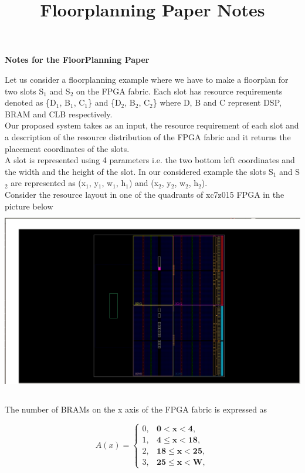 \documentclass[11pt]{article}
\theoremstyle{definition}
\begin{document}
\setcounter{section}{8}
\title{Floorplanning Paper Notes}

\thispagestyle{empty}

\begin{center}
{\LARGE \bf Notes for the FloorPlanning Paper}\\
\end{center}

Let us consider a floorplanning example where we have to make a floorplan for two slots S$_1$ and S$_2$ on the FPGA fabric. Each slot has resource requirements denoted as \{D$_1$, B$_1$, C$_1$\} and \{D$_2$, B$_2$, C$_2$\} where D, B and C represent DSP, BRAM and CLB respectively. \\ Our proposed system takes as an input, the resource requirement of each slot and a description of the resource distribution of the FPGA fabric and it returns the placement coordinates of the slots. \\
A slot is represented using 4 parameters i.e. the two bottom left coordinates and the width and the height of the slot. In our considered example the slots S$_1$ and S$_2$ are represented as (x$_1$, y$_1$, w$_1$, h$_1$) and (x$_2$, y$_2$, w$_2$, h$_2$). \\

Consider the resource layout in one of the quadrants of xc7z015 FPGA in the picture below
\includegraphics[width=\textwidth, height=8cm]{graphics/fpga_1.png} \\ \\

The number of BRAMs on the x axis of the FPGA fabric is expressed as 

\begin{equation}
A(x) = \begin{cases}
0, & \textbf{0$<$x$<$4}, \\
1, & \textbf{4$\leq$x$<$18}, \\
2, & \textbf{18$\leq$x$<$25}, \\
3, & \textbf{25$\leq$x$<$W},
\end{cases}
\end{equation}
\end{document}
